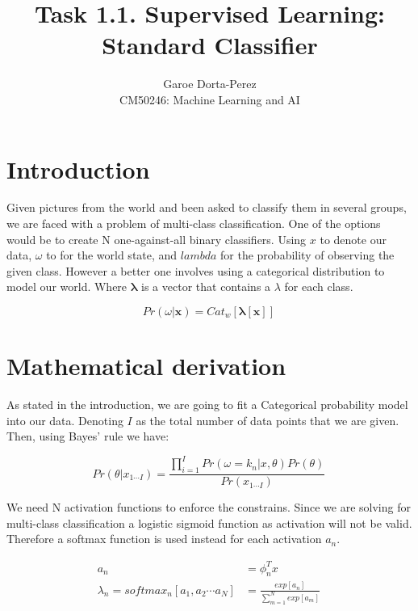 \documentclass[12pt]{article}
\begin{document}
  
\title{Task 1.1. Supervised Learning: Standard Classifier}
\author{Garoe Dorta-Perez\\
CM50246: Machine Learning and AI}
 
\maketitle
 
\section{Introduction}
 
Given pictures from the world and been asked to classify them in several groups, we are faced with a problem of multi-class classification.
One of the options would be to create N one-against-all binary classifiers. Using $x$ to denote our data, $\omega$ to for the world state, and $lambda$ for the probability of observing the given class. However a better one involves using a categorical distribution to model our world. Where $\bm{\lambda}$ is a vector that contains a $\lambda$ for each class.

\begin{equation}
\label{categoricalDistribution}
Pr(\omega|\mathbf{x}) = Cat_{w}[\bm{\lambda}[\mathbf{x}]]\,
\end{equation}

\section{Mathematical derivation}

As stated in the introduction, we are going to fit a Categorical probability model into our data. 
Denoting $I$ as the total number of data points that we are given.  
Then, using Bayes' rule we have:

\begin{equation}
\label{bayes}
Pr(\theta | x_{1 \cdots I}) = \frac{\prod_{i = 1}^{I} Pr(\omega = k_{n} | x, \theta) Pr(\theta)} {Pr(x_{1 \cdots I})}\,
\end{equation}

We need N activation functions to enforce the constrains.
Since we are solving for multi-class classification a logistic sigmoid function as activation will not be valid.
Therefore a softmax function is used instead for each activation $a_{n}$.

\begin{align}
\label{activations}
a_{n} &= \phi_{n}^{T}x \\
\lambda_{n} = softmax_{n}[a_{1}, a_{2} \cdots a_{N}] &= 
\frac{exp[a_{n}]} {\sum_{m = 1}^{N} exp[a_{m}] }\,
\end{align}
\end{document}
